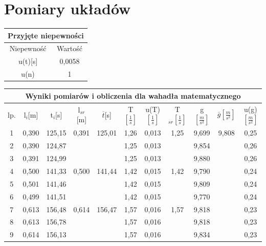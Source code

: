 \documentclass[12pt]{article}
\begin{document}
\section{Pomiary układów}

\begin{table}[!htbp]
    \centering
    \begin{adjustbox}{width=0.4\textwidth}
    \begin{tabular}{|c|c|}
    \hline
    \multicolumn{2}{|c|}{Przyjęte niepewności} \\
    \hline
    Niepewność & Wartość \\ \hline
    u(t)[s] & 0,0058 \\ \hline
    u(n) & 1 \\ \hline
    \end{tabular}
\end{adjustbox}
\end{table}

\begin{table}[!htbp]
    \centering
    \begin{adjustbox}{width=1\textwidth}
    \begin{tabular}{|c|c|c|c|c|c|c|c|c|c|c|}
    \hline
    \multicolumn{11}{|c|}{Wyniki pomiarów i obliczenia dla wahadła matematycznego} \\
    \hline
    lp. & l$_i$[m] & t$_i$[s] & l$_{sr}$[m] & $\overline{t}$[s] & T$\left[ \frac{1}{s} \right]$ & u(T)$\left[\frac{1}{s}\right]$ & T$_{sr}\left[ \frac{1}{s} \right]$ & g$\left[ \frac{m}{s^2} \right]$ & $\overline{g} \left[ \frac{m}{s^2} \right]$ & u(g)$\left[ \frac{m}{s^2} \right] $ 
    \\[10pt] \hline
    1 & 0,390 & 125,15 & 0,391 & 125,01 & 1,26 & 0,013 & 1,25 & 9,699 & 9,808 & 0,25\\
    2 & 0,390 & 124,87 & ~ & ~ & 1,25          & 0,013 & ~     & 9,854 & ~ & 0,26\\
    3 & 0,391 & 124,99 & ~ & ~ & 1,25          & 0,013 & ~     & 9,880 & ~ & 0,26\\ \hline
    4 & 0,500 & 141,33 & 0,500 & 141,44 & 1,42 & 0,015 & 1,42  & 9,790 & ~ & 0,24\\
    5 & 0,501 & 141,46 & ~ & ~ & 1,42          & 0,015 & ~     & 9,809 & ~ & 0,24\\
    6 & 0,499 & 141,51 & ~ & ~ & 1,42          & 0,015 & ~     & 9,770 & ~ & 0,24\\ \hline
    7 & 0,613 & 156,48 & 0,614 & 156,47 & 1,57 & 0,016 & 1,57  & 9,818 & ~ & 0,23\\
    8 & 0,613 & 156,78 & ~ & ~ & 1,57          & 0,016 & ~     & 9,818 & ~ & 0,23\\
    9 & 0,614 & 156,13 & ~ & ~ & 1,57          & 0,016 & ~     & 9,834 & ~ & 0,23\\ \hline
    \end{tabular}
\end{adjustbox}
\end{table}
\end{document}
